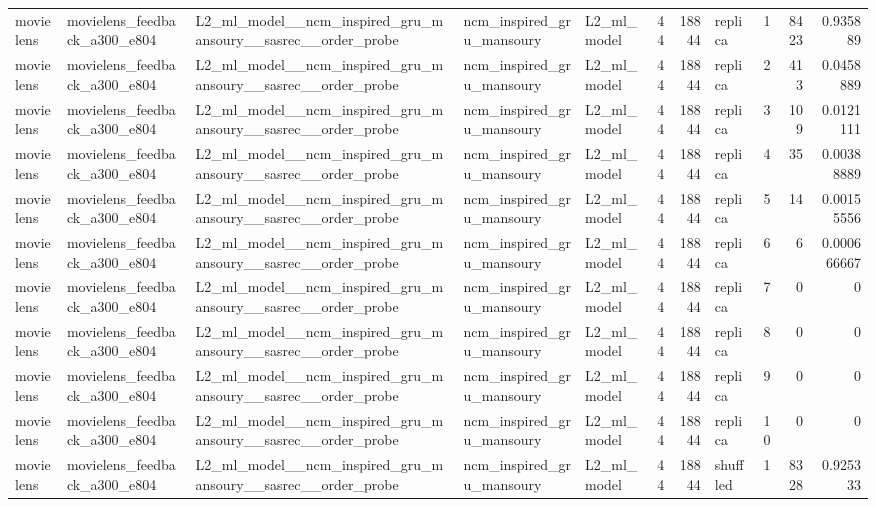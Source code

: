 \begin{table}[htbp!]
\begin{tabular}{lllllrrlrrr}
movielens & movielens\_feedback\_a300\_e804 & L2\_ml\_model\_\_ncm\_inspired\_gru\_mansoury\_\_sasrec\_\_order\_probe & ncm\_inspired\_gru\_mansoury & L2\_ml\_model & 44 & 18844 & replica & 1 & 8423 & 0.935889 \\
movielens & movielens\_feedback\_a300\_e804 & L2\_ml\_model\_\_ncm\_inspired\_gru\_mansoury\_\_sasrec\_\_order\_probe & ncm\_inspired\_gru\_mansoury & L2\_ml\_model & 44 & 18844 & replica & 2 & 413 & 0.0458889 \\
movielens & movielens\_feedback\_a300\_e804 & L2\_ml\_model\_\_ncm\_inspired\_gru\_mansoury\_\_sasrec\_\_order\_probe & ncm\_inspired\_gru\_mansoury & L2\_ml\_model & 44 & 18844 & replica & 3 & 109 & 0.0121111 \\
movielens & movielens\_feedback\_a300\_e804 & L2\_ml\_model\_\_ncm\_inspired\_gru\_mansoury\_\_sasrec\_\_order\_probe & ncm\_inspired\_gru\_mansoury & L2\_ml\_model & 44 & 18844 & replica & 4 & 35 & 0.00388889 \\
movielens & movielens\_feedback\_a300\_e804 & L2\_ml\_model\_\_ncm\_inspired\_gru\_mansoury\_\_sasrec\_\_order\_probe & ncm\_inspired\_gru\_mansoury & L2\_ml\_model & 44 & 18844 & replica & 5 & 14 & 0.00155556 \\
movielens & movielens\_feedback\_a300\_e804 & L2\_ml\_model\_\_ncm\_inspired\_gru\_mansoury\_\_sasrec\_\_order\_probe & ncm\_inspired\_gru\_mansoury & L2\_ml\_model & 44 & 18844 & replica & 6 & 6 & 0.000666667 \\
movielens & movielens\_feedback\_a300\_e804 & L2\_ml\_model\_\_ncm\_inspired\_gru\_mansoury\_\_sasrec\_\_order\_probe & ncm\_inspired\_gru\_mansoury & L2\_ml\_model & 44 & 18844 & replica & 7 & 0 & 0 \\
movielens & movielens\_feedback\_a300\_e804 & L2\_ml\_model\_\_ncm\_inspired\_gru\_mansoury\_\_sasrec\_\_order\_probe & ncm\_inspired\_gru\_mansoury & L2\_ml\_model & 44 & 18844 & replica & 8 & 0 & 0 \\
movielens & movielens\_feedback\_a300\_e804 & L2\_ml\_model\_\_ncm\_inspired\_gru\_mansoury\_\_sasrec\_\_order\_probe & ncm\_inspired\_gru\_mansoury & L2\_ml\_model & 44 & 18844 & replica & 9 & 0 & 0 \\
movielens & movielens\_feedback\_a300\_e804 & L2\_ml\_model\_\_ncm\_inspired\_gru\_mansoury\_\_sasrec\_\_order\_probe & ncm\_inspired\_gru\_mansoury & L2\_ml\_model & 44 & 18844 & replica & 10 & 0 & 0 \\
movielens & movielens\_feedback\_a300\_e804 & L2\_ml\_model\_\_ncm\_inspired\_gru\_mansoury\_\_sasrec\_\_order\_probe & ncm\_inspired\_gru\_mansoury & L2\_ml\_model & 44 & 18844 & shuffled & 1 & 8328 & 0.925333 \\

\end{tabular}
\end{table}

